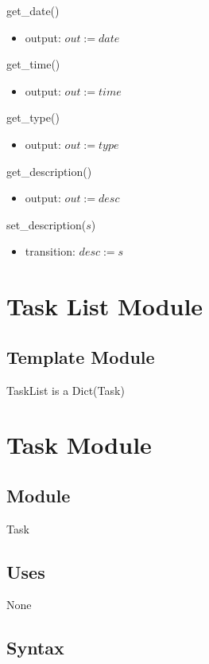 \documentclass[12pt, titlepage]{article}
\begin{document}
\noindent get\_date()
\begin{itemize}
    \item output: $out := date$
\end{itemize}

\noindent get\_time()
\begin{itemize}
    \item output: $out := time$
\end{itemize}

\noindent get\_type()
\begin{itemize}
    \item output: $out := type$
\end{itemize}

\noindent get\_description()
\begin{itemize}
    \item output: $out := desc$
\end{itemize}

\noindent set\_description($s$)
\begin{itemize}
    \item transition: $desc := s$
\end{itemize}

\newpage

\section*{Task List Module}

\subsection*{Template Module}
TaskList is a Dict(Task)

\newpage

\section*{Task Module}

\subsection*{Module}
Task

\subsection*{Uses}
None

\subsection* {Syntax}
\end{document}
